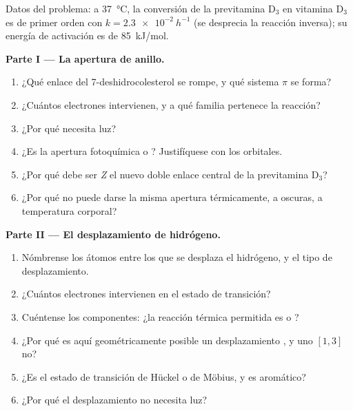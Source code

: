 \begin{problem}
\label{pb:b3:pericyclic:1}
Datos del problema: a \qty{37}{\celsius}, la conversión de la previtamina D$_3$ en vitamina D$_3$ es
de primer orden con $k = \qty{2.3e-2}{h^{-1}}$ (se desprecia la reacción inversa); su energía de activación es de
\qty{85}{kJ/mol}.

\medskip\noindent\textbf{Parte I --- La apertura de anillo.}
\begin{enumerate}
  \item ¿Qué enlace del 7-deshidrocolesterol se rompe, y qué sistema $\pi$ se forma?
  \item ¿Cuántos electrones intervienen, y a qué familia pertenece la reacción?
  \item ¿Por qué necesita luz?
  \item ¿Es la apertura fotoquímica  o ? Justifíquese con los
        orbitales.
  \item ¿Por qué debe ser \textit{Z} el nuevo doble enlace central de la previtamina D$_3$?
  \item ¿Por qué no puede darse la misma apertura térmicamente, a oscuras, a temperatura corporal?
\end{enumerate}

\medskip\noindent\textbf{Parte II --- El desplazamiento de hidrógeno.}
\begin{enumerate}[resume]
  \item Nómbrense los átomos entre los que se desplaza el hidrógeno, y el tipo de desplazamiento.
  \item ¿Cuántos electrones intervienen en el estado de transición?
  \item Cuéntense los componentes: ¿la reacción térmica permitida es 
        o ?
  \item ¿Por qué es aquí geométricamente posible un desplazamiento , y uno $[1,3]$
        no?
  \item ¿Es el estado de transición de Hückel o de Möbius, y es aromático?
  \item ¿Por qué el desplazamiento no necesita luz?
\end{enumerate}


\end{problem}
